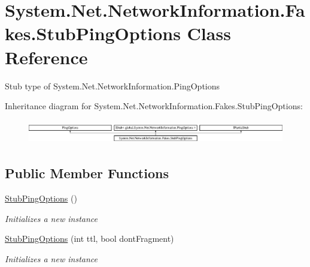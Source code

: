 \hypertarget{class_system_1_1_net_1_1_network_information_1_1_fakes_1_1_stub_ping_options}{\section{System.\-Net.\-Network\-Information.\-Fakes.\-Stub\-Ping\-Options Class Reference}
\label{class_system_1_1_net_1_1_network_information_1_1_fakes_1_1_stub_ping_options}
}


Stub type of System.\-Net.\-Network\-Information.\-Ping\-Options 


Inheritance diagram for System.\-Net.\-Network\-Information.\-Fakes.\-Stub\-Ping\-Options\-:\begin{figure}[H]
\begin{center}
\leavevmode
\includegraphics[height=1.045752cm]{class_system_1_1_net_1_1_network_information_1_1_fakes_1_1_stub_ping_options}
\end{center}
\end{figure}
\subsection*{Public Member Functions}
\begin{DoxyCompactItemize}
\item 
\hyperlink{class_system_1_1_net_1_1_network_information_1_1_fakes_1_1_stub_ping_options_a3a66be6d6b91e6ad1d7e7f2f18fb04c0}{Stub\-Ping\-Options} ()
\begin{DoxyCompactList}\small\item\em Initializes a new instance\end{DoxyCompactList}\item 
\hyperlink{class_system_1_1_net_1_1_network_information_1_1_fakes_1_1_stub_ping_options_a1770c2f8eb71668ae7e4e6c201cc3dfc}{Stub\-Ping\-Options} (int ttl, bool dont\-Fragment)
\begin{DoxyCompactList}\small\item\em Initializes a new instance\end{DoxyCompactList}\end{DoxyCompactItemize}
